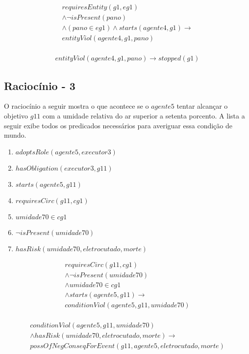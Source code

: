 \begin{eqnarray}\nonumber
	requiresEntity(g1,eg1) \nonumber \\ 
	\wedge \neg isPresent(pano) 	\nonumber \\ 
	\wedge (pano \in eg1) \wedge starts(agente4,g1) \to \nonumber \\ 
	entityViol(agente4,g1,pano) \nonumber \\
\end{eqnarray}

\begin{eqnarray}
	entityViol(agente4,g1,pano) \to stopped(g1)
\end{eqnarray}



\subsection{Raciocínio - 3} 
\label{raciocinio3}

O raciocínio a seguir mostra o que acontece se o $agente5$ tentar alcançar o objetivo $g11$ com a umidade relativa do ar superior a setenta porcento. A lista a seguir exibe todos os predicados necessários para averiguar essa condição de mundo. 

\begin{enumerate}
	\item $adoptsRole(agente5,executor3)$
	\item $hasObligation(executor3,g11)$	
	\item $starts(agente5,g11)$ 
	\item $requiresCirc(g11,cg1)$
	\item $umidade70 \in cg1$	
	\item $\neg isPresent(umidade70)$
	\item $hasRisk(umidade70,eletrocutado,morte)$
\end{enumerate}

\begin{eqnarray}
	requiresCirc(g11,cg1) \nonumber \\ 
	\wedge \neg isPresent(umidade70) \nonumber \\
	\wedge umidade70 \in cg1 \nonumber \\
	\wedge starts(agente5,g11) \to \nonumber \\  
	conditionViol(agente5,g11,umidade70) \nonumber \\
\end{eqnarray}

\begin{eqnarray} \nonumber
	conditionViol(agente5,g11,umidade70) \nonumber \\
	\wedge hasRisk(umidade70,eletrocutado,morte) \to \nonumber \\  
	possOfNegConseqForEvent(g11,agente5,eletrocutado,morte)
\end{eqnarray}


